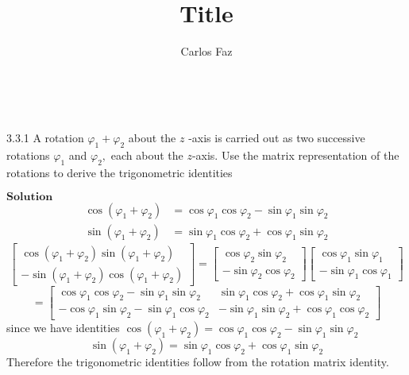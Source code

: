 \documentclass{article}
\title{Title}
\author{Carlos Faz}
\date{ \ }
\begin{document}
\maketitle

\begin{flushleft}

\begin{mybox}{3.3.1}
A rotation $\varphi_{1}+\varphi_{2}$ about the $z$ -axis is carried out as two successive rotations $\varphi_{1}$ and $\varphi_{2},$ each about the $z$-axis. Use the matrix representation of the rotations to derive the trigonometric identities
\end{mybox}
$\boxed{\textbf{Solution}}$
$$
\begin{aligned} \cos \left(\varphi_{1}+\varphi_{2}\right) &=\cos \varphi_{1} \cos \varphi_{2}-\sin \varphi_{1} \sin \varphi_{2} \\ \sin \left(\varphi_{1}+\varphi_{2}\right) &=\sin \varphi_{1} \cos \varphi_{2}+\cos \varphi_{1} \sin \varphi_{2} \end{aligned}
$$
$$\begin{bmatrix}{\cos \left(\varphi_{1}+\varphi_{2}\right) \sin \left(\varphi_{1}+\varphi_{2}\right)} \\ {-\sin \left(\varphi_{1}+\varphi_{2}\right) \cos \left(\varphi_{1}+\varphi_{2}\right)}\end{bmatrix}=\begin{bmatrix}{\cos \varphi_{2} \sin \varphi_{2}} \\ {-\sin \varphi_{2} \cos \varphi_{2}}\end{bmatrix}\begin{bmatrix}{\cos \varphi_{1} \sin \varphi_{1}} \\ {-\sin \varphi_{1} \cos \varphi_{1}}\end{bmatrix}$$
$$=\begin{bmatrix}{\cos \varphi_{1} \cos \varphi_{2}-\sin \varphi_{1} \sin \varphi_{2}} & {\sin \varphi_{1} \cos \varphi_{2}+\cos \varphi_{1} \sin \varphi_{2}} \\ {-\cos \varphi_{1} \sin \varphi_{2}-\sin \varphi_{1} \cos \varphi_{2}} & {-\sin \varphi_{1} \sin \varphi_{2}+\cos \varphi_{1} \cos \varphi_{2}}\end{bmatrix}$$
since we have identities $\cos \left(\varphi_{1}+\varphi_{2}\right)=\cos \varphi_{1} \cos \varphi_{2}-\sin \varphi_{1} \sin \varphi_{2}$
$$
\sin \left(\varphi_{1}+\varphi_{2}\right)=\sin \varphi_{1} \cos \varphi_{2}+\cos \varphi_{1} \sin \varphi_{2}
$$
Therefore the trigonometric identities follow from the rotation matrix identity.



\end{flushleft}
\end{document}
